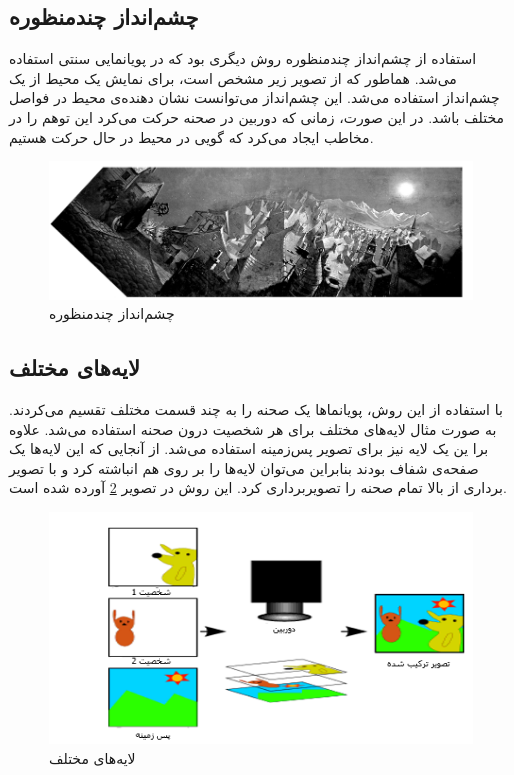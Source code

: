 \subsection{چشم‌انداز چندمنظوره}

استفاده از چشم‌انداز چندمنظوره روش دیگری بود که در پویانمایی سنتی استفاده می‌شد.
هماطور که از تصویر زیر مشخص است، برای نمایش یک محیط از یک چشم‌انداز استفاده می‌شد.
این چشم‌انداز می‌توانست نشان دهنده‌ی محیط در فواصل مختلف باشد. در این صورت، زمانی که 
دوربین در صحنه حرکت می‌کرد این توهم را در مخاطب ایجاد می‌کرد که گویی در محیط در حال حرکت هستیم.

\begin{figure}[ht]
	\centerline{\includegraphics[width=\textwidth,height=\textheight,keepaspectratio]{Figures/Ch1/Panorama.png}}

	\caption{چشم‌انداز چندمنظوره}
	\label{fig:Panorama}
\end{figure}


\subsection{لایه‌های مختلف}

با استفاده از این روش، پویانما‌ها یک صحنه را به چند قسمت مختلف تقسیم می‌کردند.
به صورت مثال لایه‌های مختلف برای هر شخصیت درون صحنه استفاده می‌شد. علاوه برا ین یک لایه نیز برای تصویر پس‌زمینه استفاده می‌شد.
از آنجایی که این لایه‌ها یک صفحه‌ی شفاف بودند بنابراین می‌توان لایه‌‌ها را 
بر روی هم انباشته کرد و با تصویر برداری از بالا تمام صحنه را تصویربرداری کرد.
این روش در تصویر 
\ref{fig:DifferentLayers}
آورده شده است.

\begin{figure}[ht]
	\centerline{\includegraphics[width=\textwidth,height=\textheight,keepaspectratio]{Figures/Ch1/DifferentLayers.png}}

	\caption{لایه‌های مختلف}
	\label{fig:DifferentLayers}
\end{figure}

